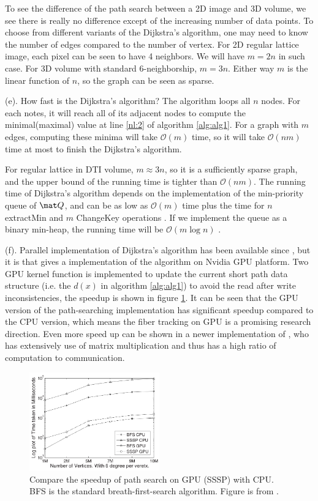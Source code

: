 \documentclass[12pt]{article}
\begin{document}
To see the difference of the path search between a 2D image and 3D volume, we
see there is really no difference except of the increasing number of data
points. To choose from different variants of the Dijkstra's algorithm, one may
need to know the number of edges compared to the number of vertex. For 2D
regular lattice image, each pixel can be seen to have 4 neighbors. We will have $m = 2n$ in such case. For 3D volume with standard
6-neighborship, $m = 3n$. Either way $m$ is the linear function of $n$, so the
graph can be seen as sparse.

(e). How fast is the Dijkstra's algorithm? The algorithm loops all $n$
nodes. For each notes, it will reach all of its adjacent nodes to compute the
minimal(maximal) value at line \ref{nl:2} of algorithm \ref{alg:alg1}. For a
graph with $m$ edges, computing these minima will take $\mathcal{O}(m)$ time, so
it will take $\mathcal{O}(nm)$ time at most to finish the Dijkstra's algorithm.

For regular lattice in DTI volume, $m\approx 3n$, so it is a sufficiently sparse
graph, and the upper bound of the running time is tighter than
$\mathcal{O}(nm)$.  The running time of Dijkstra's algorithm depends on the
implementation of the min-priority queue of $\mat Q$, and can be as low as
$\mathcal{O}(m)$ time plus the time for $n$ \textsf{extractMin} and $m$
\textsf{ChangeKey} operations \citep[chap 4.4]{kleinberg2006algorithm}.  If we
implement the queue as a binary min-heap, the running time will be
$\mathcal{O}(m\log n)$ \citep[chap 24.3] {cormen2001introduction}.

(f). Parallel implementation of Dijkstra's algorithm has been available since
\citet{nepomniaschaya2000simple}, but it is \citet{harish2007accelerating} that
gives a implementation of the algorithm on Nvidia GPU platform. Two GPU kernel
function is implemented to update the current short path data structure
(i.e. the $d(x)$ in algorithm \ref{alg:alg1}) to avoid the read after write
inconsistencies, the speedup is shown in figure \ref{fig:gpu}. It can be seen
that the GPU version of the path-searching implementation has significant speedup
compared to the CPU version, which means the fiber tracking on GPU is a
promising research direction. Even more speed up can be shown in a newer
implementation of \citet{buluē2010solving}, who has extensively use of matrix
multiplication and thus has a high ratio of computation to communication.
\begin{figure}
  \centering
  \includegraphics[width=0.5\textwidth]{gpu}
  \caption{Compare the speedup of path search on GPU (SSSP) with CPU. BFS is the
    standard breath-first-search algorithm. Figure is from \citet{harish2007accelerating}. }
  \label{fig:gpu}
\end{figure}
\end{document}
